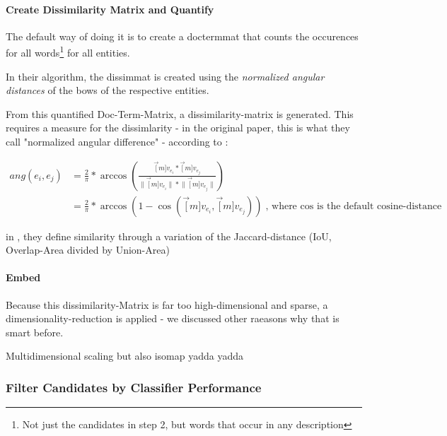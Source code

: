 \paragraph{Create Dissimilarity Matrix and Quantify}

The default way of doing it is to create a \gls{doctermmat} that counts the occurences for all words\footnote{Not just the candidates in step 2, but words that occur in any description} for all entities.

In their algorithm, the \gls{dissimmat} is created using the \emph{normalized angular distances} of the \glspl{bow} of the respective entities.  

From this quantified Doc-Term-Matrix, a dissimilarity-matrix is generated. This requires a measure for the dissimlarity - in the original paper, this is what they call "normalized angular difference" - according to \cite{Derrac2015}:

\begin{align}
	ang(e_i, e_j) &= \frac{2}{\pi} * \arccos \left( \frac{\vec[m]{v_{e_i}} * \vec[m]{v_{e_j}}} { \lVert \vec[m]{v_{e_i}} \rVert * \lVert \vec[m]{v_{e_j}} \rVert }  \right)  \label{eq:norm_ang_dist} \\
	&= \frac{2}{\pi} * \arccos(1-\cos(\vec[m]{v_{e_i}},\vec[m]{v_{e_j}})) \text{, where $\cos$ is the default cosine-distance} \nonumber
\end{align}

in \cite{Schockaert2011}, they define similarity through a variation of the Jaccard-distance (IoU, Overlap-Area divided by Union-Area)

\paragraph{Embed}

Because this dissimilarity-Matrix is far too high-dimensional and sparse, a dimensionality-reduction is applied - we discussed other raeasons why that is smart before.

Multidimensional scaling but also isomap yadda yadda


\subsubsection{Filter Candidates by Classifier Performance}
\label{sec:svm_filter_cands}


